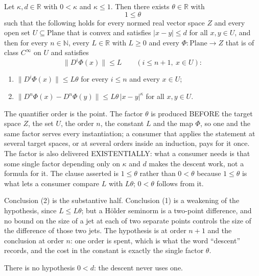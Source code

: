 \begin{lemma}
Let $\kappa,d\in\mathbb{R}$ with $0<\kappa$ and $\kappa\le1$.  Then there exists
$\theta\in\mathbb{R}$ with
\[
  1\le\theta
\]
such that the following holds for every normed real vector space $Z$ and every open set
$U\subseteq\mathrm{Plane}$ that is convex and satisfies $\lvert x-y\rvert\le d$ for all
$x,y\in U$, and then for every $n\in\mathbb{N}$, every $L\in\mathbb{R}$ with $L\ge0$ and every
$\Phi\colon\mathrm{Plane}\to Z$ that is of class $C^{\infty}$ on $U$ and satisfies
\[
  \bigl\lVert D^{i}\Phi(x)\bigr\rVert\le L
  \qquad(i\le n+1,\ x\in U):
\]
\begin{enumerate}
\item[(1)] $\bigl\lVert D^{i}\Phi(x)\bigr\rVert\le L\theta$ for every $i\le n$ and every
$x\in U$;
\item[(2)] $\bigl\lVert D^{n}\Phi(x)-D^{n}\Phi(y)\bigr\rVert\le L\theta\,\lvert
x-y\rvert^{\kappa}$ for all $x,y\in U$.
\end{enumerate}

The quantifier order is the point.  The factor $\theta$ is produced BEFORE the target space $Z$,
the set $U$, the order $n$, the constant $L$ and the map $\Phi$, so one and the same factor
serves every instantiation; a consumer that applies the statement at several target spaces, or
at several orders inside an induction, pays for it once.  The factor is also delivered
EXISTENTIALLY: what a consumer needs is that some single factor depending only on $\kappa$ and
$d$ makes the descent work, not a formula for it.  The clause asserted is $1\le\theta$ rather
than $0<\theta$ because $1\le\theta$ is what lets a consumer compare $L$ with $L\theta$;
$0<\theta$ follows from it.

Conclusion (2) is the substantive half.  Conclusion (1) is a weakening of the hypothesis, since
$L\le L\theta$; but a H\"older seminorm is a two-point difference, and no bound on the size of a
jet at each of two separate points controls the size of the difference of those two jets.  The
hypothesis is at order $n+1$ and the conclusion at order $n$: one order is spent, which is what
the word ``descent'' records, and the cost in the constant is exactly the single factor $\theta$.

There is no hypothesis $0<d$: the descent never uses one.
\end{lemma}
